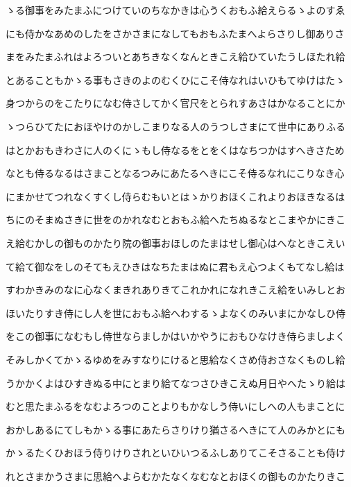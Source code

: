 \documentclass[a4paper,11pt,landscape]{ltjtarticle}
\begin{document}
ゝる御事をみたまふにつけていのちなかきは心うくおもふ給えらるゝよのすゑ
\par\medskip
にも侍かなあめのしたをさかさまになしてもおもふたまへよらさりし御ありさ
\par\medskip
まをみたまふれはよろついとあちきなくなんときこえ給ひていたうしほたれ給
\par\medskip
とあることもかゝる事もさきのよのむくひにこそ侍なれはいひもてゆけはたゝ
\par\medskip
身つからのをこたりになむ侍さしてかく官尺をとられすあさはかなることにか
\par\medskip
ゝつらひてたにおほやけのかしこまりなる人のうつしさまにて世中にありふる
\par\medskip
はとかおもきわさに人のくにゝもし侍なるをとをくはなちつかはすへきさため
\par\medskip
なとも侍るなるはさまことなるつみにあたるへきにこそ侍るなれにこりなき心
\par\medskip
にまかせてつれなくすくし侍らむもいとはゝかりおほくこれよりおほきなるは
\par\medskip
ちにのそまぬさきに世をのかれなむとおもふ給へたちぬるなとこまやかにきこ
\par\medskip
え給むかしの御ものかたり院の御事おほしのたまはせし御心はへなときこえい
\par\medskip
て給て御なをしのそてもえひきはなちたまはぬに君もえ心つよくもてなし給は
\par\medskip
すわかきみのなに心なくまきれありきてこれかれになれきこえ給をいみしとお
\par\medskip
ほいたりすき侍にし人を世におもふ給へわするゝよなくのみいまにかなしひ侍
\par\medskip
をこの御事になむもし侍世ならましかはいかやうにおもひなけき侍らましよく
\par\medskip
そみしかくてかゝるゆめをみすなりにけると思給なくさめ侍おさなくものし給
\par\medskip
うかかくよはひすきぬる中にとまり給てなつさひきこえぬ月日やへたゝり給は
\par\medskip
むと思たまふるをなむよろつのことよりもかなしう侍いにしへの人もまことに
\par\medskip
おかしあるにてしもかゝる事にあたらさりけり猶さるへきにて人のみかとにも
\par\medskip
かゝるたくひおほう侍りけりされといひいつるふしありてこそさることも侍け
\par\medskip
れとさまかうさまに思給へよらむかたなくなむなとおほくの御ものかたりきこ
\par\medskip
\end{document}
